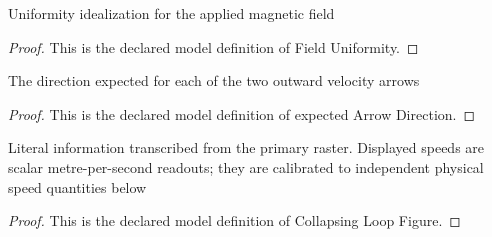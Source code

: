 \begin{definition}
  \label{def:physics:phyx-mini-0884:phyxminiproblems-problemphyxmini0884-fielduniformity}
  Uniformity idealization for the applied magnetic field
\end{definition}
\begin{proof}
  This is the declared model definition of Field Uniformity.
\end{proof}
\begin{definition}
  \label{def:physics:phyx-mini-0884:phyxminiproblems-problemphyxmini0884-expectedarrowdirection}
  The direction expected for each of the two outward velocity arrows
\end{definition}
\begin{proof}
  This is the declared model definition of expected Arrow Direction.
\end{proof}
\begin{definition}
  \label{def:physics:phyx-mini-0884:phyxminiproblems-problemphyxmini0884-collapsingloopfigure}
  Literal information transcribed from the primary raster. Displayed speeds are scalar metre-per-second readouts; they are calibrated to independent physical speed quantities below
\end{definition}
\begin{proof}
  This is the declared model definition of Collapsing Loop Figure.
\end{proof}
